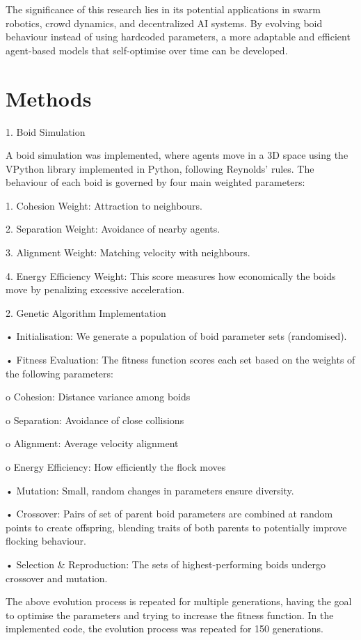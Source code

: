 \documentclass[twocolumn, a4paper, 12pt]{article}
\begin{document}
The significance of this research lies in its potential applications in swarm robotics, crowd dynamics, and decentralized AI systems. By evolving boid behaviour instead of using hardcoded parameters, a more adaptable and efficient agent-based models that self-optimise over time can be developed.


\section{Methods}
1. Boid Simulation

A boid simulation was implemented, where agents move in a 3D space using the VPython library implemented in Python, following Reynolds' rules. The behaviour of each boid is governed by four main weighted parameters:

    1. Cohesion Weight: Attraction to neighbours.
    
    2. Separation Weight: Avoidance of nearby agents.
    
    3. Alignment Weight: Matching velocity with neighbours.
    
    4. Energy Efficiency Weight: This score measures how economically the boids move by penalizing excessive acceleration.


2. Genetic Algorithm Implementation

    • Initialisation: We generate a population of boid parameter sets (randomised).
    
    • Fitness Evaluation: The fitness function scores each set based on the weights of the following parameters:
    
        o Cohesion: Distance variance among boids
        
        o Separation: Avoidance of close collisions
        
        o Alignment: Average velocity alignment
        
        o Energy Efficiency: How efficiently the flock moves

    • Mutation: Small, random changes in parameters ensure diversity.

    • Crossover: Pairs of set of parent boid parameters are combined at random points to create offspring, blending traits of both parents to potentially improve flocking behaviour.
        
    • Selection \& Reproduction: The sets of highest-performing boids undergo crossover and mutation.

    The above evolution process is repeated for multiple generations, having the goal to optimise the parameters and trying to increase the fitness function. In the implemented code, the evolution process was repeated for 150 generations.
\end{document}

